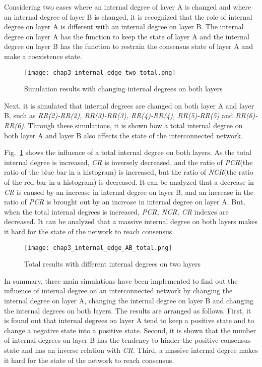 Considering two cases where an internal degree of layer A is changed and where an internal degree of layer B is changed, it is recognized that the role of internal degree on layer A is different with an internal degree on layer B. The internal degree on layer A has the function to keep the state of layer A and the internal degree on layer B has the function to restrain the consensus state of layer A and make a coexistence state. 

\begin{figure}[!htb]
	\centering
	\texttt{[image: chap3\_internal\_edge\_two\_total.png]}
	\caption{Simulation results with changing internal degrees on both layers}
	\label{chap3_internal_edge_two_total}
\end{figure}

Next, it is simulated that internal degrees are changed on both layer A and layer B, such as \textit{RR(2)-RR(2), RR(3)-RR(3), RR(4)-RR(4), RR(5)-RR(5)} and \textit{RR(6)-RR(6)}. Through these simulations, it is shown how a total internal degree on both layer A and layer B also affects the state of the interconnected network.

Fig.~\ref{chap3_internal_edge_two_total} shows the influence of a total internal degree on both layers. As the total internal degree is increased, \textit{CR} is inversely decreased, and the ratio of \textit{PCR}(the ratio of the blue bar in a histogram) is increased, but the ratio of \textit{NCR}(the ratio of the red bar in a histogram) is decreased. It can be analyzed that a decrease in \textit{CR} is caused by an increase in internal degree on layer B, and an increase in the ratio of \textit{PCR} is brought out by an increase in internal degree on layer A. But, when the total internal degrees is increased, \textit{PCR, NCR, CR} indexes are decreased. It can be analyzed that a massive internal degree on both layers makes it hard for the state of the network to reach consensus. 
\begin{figure}[!htb]
	\centering
	\texttt{[image: chap3\_internal\_edge\_AB\_total.png]}
	\caption{Total results with different internal degrees on two layers}
	\label{chap3_internal_edge_AB_total}
\end{figure}

In summary, three main simulations have been implemented to find out the influence of internal degree on an interconnected network by changing the internal degree on layer A, changing the internal degree on layer B and changing the internal degrees on both layers. The results are arranged as follows. First, it is found out that internal degrees on layer A tend to keep a positive state and to change a negative state into a positive state. Second,  it is shown that the number of internal degrees on layer B has the tendency to hinder the positive consensus state and has an inverse relation with \textit{CR}. Third, a massive internal degree makes it hard for the state of the network to reach consensus. 

